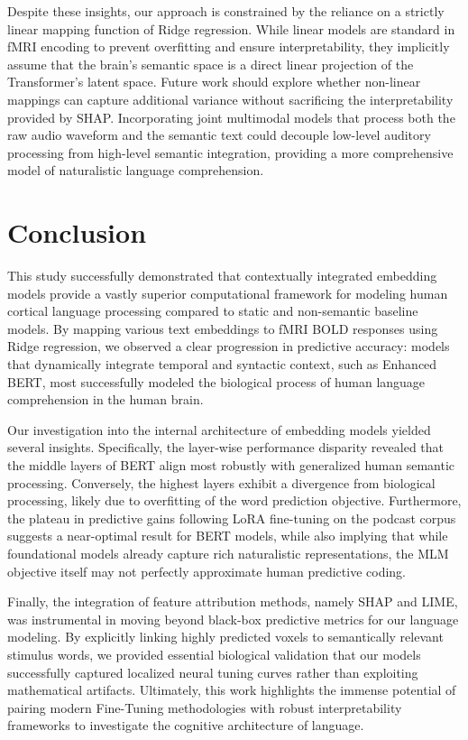 \documentclass[letterpaper,11pt]{article}
\begin{document}
Despite these insights, our approach is constrained by the reliance on a strictly linear mapping function of Ridge regression. While linear models are standard in fMRI encoding to prevent overfitting and ensure interpretability, they implicitly assume that the brain's semantic space is a direct linear projection of the Transformer's latent space. Future work should explore whether non-linear mappings can capture additional variance without sacrificing the interpretability provided by SHAP. Incorporating joint multimodal models that process both the raw audio waveform and the semantic text could decouple low-level auditory processing from high-level semantic integration, providing a more comprehensive model of naturalistic language comprehension.



\section{Conclusion}

This study successfully demonstrated that contextually integrated embedding models provide a vastly superior computational framework for modeling human cortical language processing compared to static and non-semantic baseline models. By mapping various text embeddings to fMRI BOLD responses using Ridge regression, we observed a clear progression in predictive accuracy: models that dynamically integrate temporal and syntactic context, such as Enhanced BERT, most successfully modeled the biological process of human language comprehension in the human brain. 

Our investigation into the internal architecture of embedding models yielded several insights. Specifically, the layer-wise performance disparity revealed that the middle layers of BERT align most robustly with generalized human semantic processing. Conversely, the highest layers exhibit a divergence from biological processing, likely due to overfitting of the word prediction objective. Furthermore, the plateau in predictive gains following LoRA fine-tuning on the podcast corpus suggests a near-optimal result for BERT models, while also implying that while foundational models already capture rich naturalistic representations, the MLM objective itself may not perfectly approximate human predictive coding.

Finally, the integration of feature attribution methods, namely SHAP and LIME, was instrumental in moving beyond black-box predictive metrics for our language modeling. By explicitly linking highly predicted voxels to semantically relevant stimulus words, we provided essential biological validation that our models successfully captured localized neural tuning curves rather than exploiting mathematical artifacts. Ultimately, this work highlights the immense potential of pairing modern Fine-Tuning methodologies with robust interpretability frameworks to investigate the cognitive architecture of language. 
\end{document}
